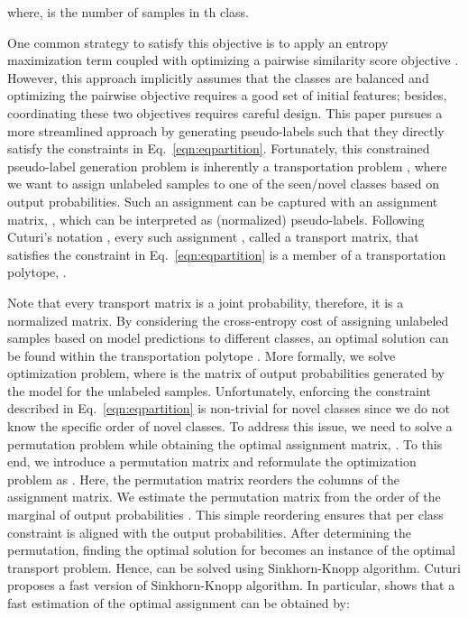 \documentclass[runningheads]{eccv2022submission}
\begin{document}
\noindent where,  is the number of samples in th class. 


One common strategy to satisfy this objective is to apply an entropy maximization term coupled with optimizing a pairwise similarity score objective \cite{cao2022openworld,van2020scan}. However, this approach implicitly assumes that the classes are balanced and optimizing the pairwise objective requires a good set of initial features; besides, coordinating these two objectives requires careful design. This paper pursues a more streamlined approach by generating pseudo-labels such that they directly satisfy the constraints in Eq.~\ref{eqn:eqpartition}. Fortunately, this constrained pseudo-label generation problem is inherently a transportation problem \cite{kantorovich1942translation,brenier1987decomposition}, where we want to assign unlabeled samples to one of the seen/novel classes based on output probabilities. Such an assignment can be captured with an assignment matrix, , which can be interpreted as (normalized) pseudo-labels. Following Cuturi's notation \cite{cuturi2013sinkhorn}, every such assignment , called a transport matrix, that satisfies the constraint in Eq.~\ref{eqn:eqpartition} is a member of a transportation polytope, . 

\setlength{\abovedisplayskip}{-6pt}
\setlength{\belowdisplayskip}{2pt}
\setlength{\abovedisplayshortskip}{0pt}
\setlength{\belowdisplayshortskip}{0pt}



Note that every transport matrix  is a joint probability, therefore, it is a normalized matrix. By considering the cross-entropy cost of assigning unlabeled samples based on model predictions to different classes, an optimal solution can be found within the transportation polytope . More formally, we solve  optimization problem, where  is the matrix of output probabilities generated by the model for the unlabeled samples. Unfortunately, enforcing the constraint described in Eq.~\ref{eqn:eqpartition} is non-trivial for novel classes since we do not know the specific order of novel classes. To address this issue, we need to solve a permutation problem while obtaining the optimal assignment matrix, . To this end, we introduce a permutation matrix  and reformulate the optimization problem as . Here, the permutation matrix  reorders the columns of the assignment matrix. We estimate the permutation matrix  from the order of the marginal of output probabilities . This simple reordering ensures that per class constraint is aligned with the output probabilities. After determining the permutation, finding the optimal solution for  becomes an instance of the optimal transport problem. Hence, can be solved using Sinkhorn-Knopp algorithm. Cuturi \cite{cuturi2013sinkhorn} proposes a fast version of Sinkhorn-Knopp algorithm. In particular, \cite{cuturi2013sinkhorn} shows that a fast estimation of the optimal assignment can be obtained by:
\end{document}
